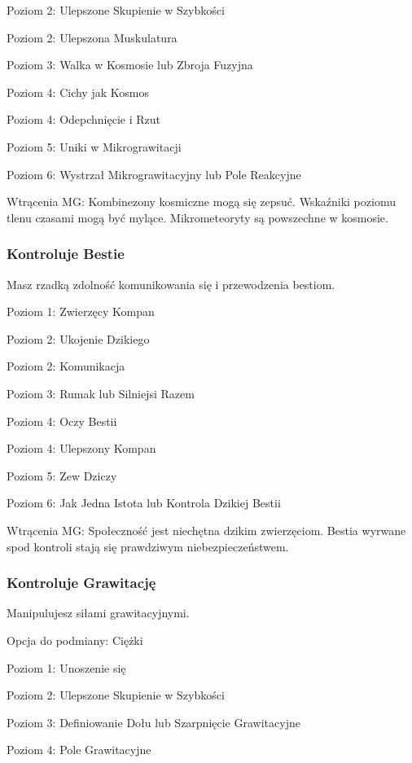 Poziom 2: Ulepszone Skupienie w Szybkości

Poziom 2: Ulepszona Muskulatura

Poziom 3: Walka w Kosmosie lub Zbroja Fuzyjna

Poziom 4: Cichy jak Kosmos

Poziom 4: Odepchnięcie i Rzut

Poziom 5: Uniki w Mikrograwitacji

Poziom 6: Wystrzał Mikrograwitacyjny lub Pole Reakcyjne

Wtrącenia MG: Kombinezony kosmiczne mogą się zepsuć. Wskaźniki poziomu tlenu czasami mogą być mylące. Mikrometeoryty są powszechne w kosmosie.

\subsubsection{Kontroluje Bestie}

Masz rzadką zdolność komunikowania się i przewodzenia bestiom.

Poziom 1: Zwierzęcy Kompan

Poziom 2: Ukojenie Dzikiego

Poziom 2: Komunikacja

Poziom 3: Rumak lub Silniejsi Razem

Poziom 4: Oczy Bestii

Poziom 4: Ulepszony Kompan

Poziom 5: Zew Dziczy

Poziom 6: Jak Jedna Istota lub Kontrola Dzikiej Bestii

Wtrącenia MG: Społeczność jest niechętna dzikim zwierzęciom. Bestia wyrwane spod kontroli stają się prawdziwym niebezpieczeństwem. 

\subsubsection{Kontroluje Grawitację}

Manipulujesz siłami grawitacyjnymi.

Opcja do podmiany: Ciężki

Poziom 1: Unoszenie się

Poziom 2: Ulepszone Skupienie w Szybkości

Poziom 3: Definiowanie Dołu lub Szarpnięcie Grawitacyjne

Poziom 4: Pole Grawitacyjne

